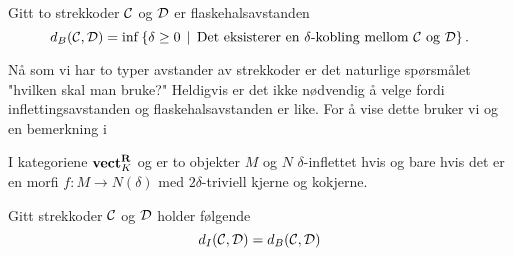 \begin{definisjon}\label{def:FlaskAvst}
Gitt to strekkoder $\mathcal{C}$ og $\mathcal{D}$ er flaskehalsavstanden
\[d_B(\mathcal{C},\mathcal{D}) = \inf\left\{\delta\geq 0\,\mid\,\text{Det eksisterer en $\delta$-kobling mellom $\mathcal{C}$ og $\mathcal{D}$}\right\}.\]
\end{definisjon}

Nå som vi har to typer avstander av strekkoder er det
naturlige spørsmålet "hvilken skal man bruke?" Heldigvis
er det ikke nødvendig å velge fordi inflettingsavstanden
og flaskehalsavstanden er like. For å vise dette bruker vi
\citep[proposisjon 4.2]{Bauer2020} og en bemerkning
i \citep[seksjon 4.2]{Bauer2020}

\begin{proposisjon}\label{prop:Prop2.4-Bauer2020}
  I kategoriene $\textnormal{\textbf{vect}}_K^{\textnormal{\textbf{{R}}}}$ og \Barc er to objekter $M$ og $N$
  $\delta$-inflettet hvis og bare hvis det er en morfi $f: M\to
  N(\delta)$ med $2\delta$-triviell kjerne og kokjerne.
\end{proposisjon}

\begin{bemerk}\label{bem:r_delta}

\end{bemerk}

\begin{teorem}\label{trm:FA_lik_IA}
Gitt strekkoder $\mathcal{C}$ og $\mathcal{D}$ holder følgende
\[d_I(\mathcal{C},\mathcal{D}) = d_B(\mathcal{C},\mathcal{D})\]
\end{teorem}
\bevis{

}
